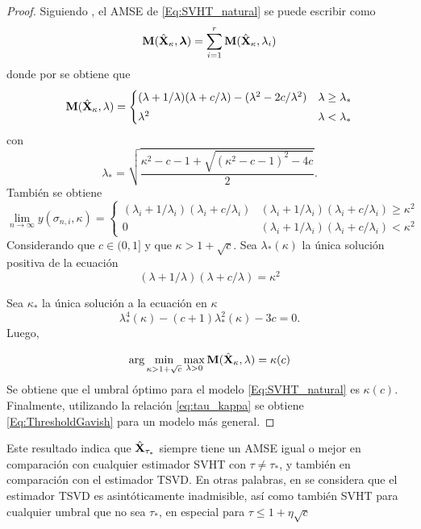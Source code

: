 \begin{proof}
        Siguiendo \cite{Gavish2014}, el AMSE de \eqref{Eq:SVHT_natural} se puede escribir como
        \begin{equation}
		      \mathbf{M}(\hat{\mathbf{X}}_{\kappa}, \boldsymbol{\lambda}) = \sum_{i=1}^r\mathbf{M}(\hat{\mathbf{X}}_{\kappa}, \lambda_i)
            \label{Eq:sumAMSE}
        \end{equation} 
        donde por \cite{Benaych2012} se obtiene que 
        \begin{equation}
	           \mathbf{M}(\hat{\mathbf{X}}_{\kappa}, \lambda) = \begin{cases} (\lambda + 1/\lambda)(\lambda + c/\lambda)-(\lambda^2-2c/\lambda^2) & \lambda\ge\lambda_*\\[0.3em]
		        \lambda^2 & \lambda <\lambda_*
	       \end{cases}
        \end{equation}
        con
        \[\lambda_* = \sqrt{\frac{\kappa^2-c-1+\sqrt{(\kappa^2-c-1)^2-4c}}{2}}.\]
        También se obtiene
        \begin{equation}
	\lim_{n\to\infty}y(\sigma_{n,i},\kappa)=\begin{cases} (\lambda_i+1/\lambda_i)(\lambda_i+c/\lambda_i) & (\lambda_i+1/\lambda_i)(\lambda_i+c/\lambda_i)\ge \kappa^2\\[0.3em]
		0 & (\lambda_i+1/\lambda_i)(\lambda_i+c/\lambda_i)< \kappa^2
	\end{cases}
\end{equation}
Considerando que $c\in(0,1]$ y que $\kappa>1+\sqrt{c}$. Sea $\lambda_*(\kappa)$ la única solución positiva de la ecuación
\[(\lambda + 1/\lambda)(\lambda + c/\lambda) = \kappa^2\]

Sea $\kappa_*$ la única solución a la ecuación en $\kappa$
\[\lambda_*^{4}(\kappa) - (c+1)\lambda_*^{2}(\kappa)-3c = 0.\]
Luego,

\[\arg\min_{\kappa >1+\sqrt{c}}\max_{\lambda>0}\mathbf{M}(\hat{\mathbf{X}}_{\kappa},\lambda) = \kappa(c)\]
Se obtiene que el umbral óptimo para el modelo  \eqref{Eq:SVHT_natural} es $\kappa(c)$. Finalmente, utilizando la relación \eqref{eq:tau_kappa} se obtiene \eqref{Eq:ThresholdGavish} para un modelo más general.
\end{proof}
			
	Este resultado indica que $\hat{\mathbf{X}}_{\tau_*}$ siempre tiene un AMSE igual o mejor en comparación con cualquier estimador SVHT con $\tau\neq\tau_*$, y también en comparación con el estimador TSVD. En otras palabras, en \cite{Gavish2014} se considera que el estimador TSVD es asintóticamente inadmisible, así como también SVHT para cualquier umbral que no sea $\tau_*$, en especial para $\tau\le 1+\eta\sqrt{c}$
		
